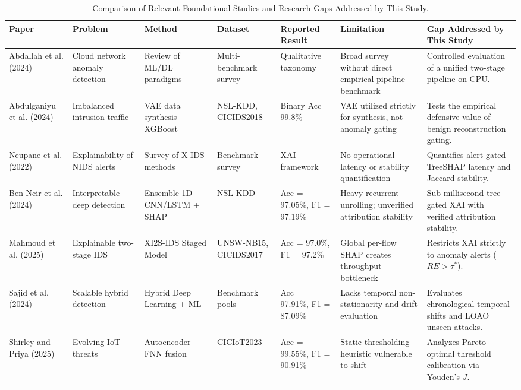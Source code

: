 \documentclass[journal]{IEEEtran}
\begin{document}
\begin{table}[!t]
\centering
\caption{Comparison of Relevant Foundational Studies and Research Gaps Addressed by This Study.}
\label{tab:gap}
\scriptsize
\setlength{\tabcolsep}{3pt}
\renewcommand{\arraystretch}{1.2}
\begin{tabularx}{\textwidth}{P{0.14\textwidth}P{0.13\textwidth}P{0.12\textwidth}P{0.11\textwidth}P{0.12\textwidth}P{0.13\textwidth}Y}
\toprule
\textbf{Paper} & \textbf{Problem} & \textbf{Method} & \textbf{Dataset} & \textbf{Reported Result} & \textbf{Limitation} & \textbf{Gap Addressed by This Study}\\
\midrule
Abdallah et al. (2024) \cite{abdallah2024} & Cloud network anomaly detection & Review of ML/DL paradigms & Multi-benchmark survey & Qualitative taxonomy & Broad survey without direct empirical pipeline benchmark & Controlled evaluation of a unified two-stage pipeline on CPU.\\
Abdulganiyu et al. (2024) \cite{abdulganiyu2024} & Imbalanced intrusion traffic & VAE data synthesis + XGBoost & NSL-KDD, CICIDS2018 & Binary Acc = 99.8\% & VAE utilized strictly for synthesis, not anomaly gating & Tests the empirical defensive value of benign reconstruction gating.\\
Neupane et al. (2022) \cite{neupane2022} & Explainability of NIDS alerts & Survey of X-IDS methods & Benchmark survey & XAI framework & No operational latency or stability quantification & Quantifies alert-gated TreeSHAP latency and Jaccard stability.\\
Ben Ncir et al. (2024) \cite{benncir2024} & Interpretable deep detection & Ensemble 1D-CNN/LSTM + SHAP & NSL-KDD & Acc = 97.05\%, F1 = 97.19\% & Heavy recurrent unrolling; unverified attribution stability & Sub-millisecond tree-gated XAI with verified attribution stability.\\
Mahmoud et al. (2025) \cite{mahmoud2025} & Explainable two-stage IDS & XI2S-IDS Staged Model & UNSW-NB15, CICIDS2017 & Acc = 97.0\%, F1 = 97.2\% & Global per-flow SHAP creates throughput bottleneck & Restricts XAI strictly to anomaly alerts ($RE > \tau^*$).\\
Sajid et al. (2024) \cite{sajid2024} & Scalable hybrid detection & Hybrid Deep Learning + ML & Benchmark pools & Acc = 97.91\%, F1 = 87.09\% & Lacks temporal non-stationarity and drift evaluation & Evaluates chronological temporal shifts and LOAO unseen attacks.\\
Shirley and Priya (2025) \cite{shirley2025} & Evolving IoT threats & Autoencoder--FNN fusion & CICIoT2023 & Acc = 99.55\%, F1 = 90.91\% & Static thresholding heuristic vulnerable to shift & Analyzes Pareto-optimal threshold calibration via Youden's $J$.\\

\end{tabularx}
\end{table}
\end{document}
